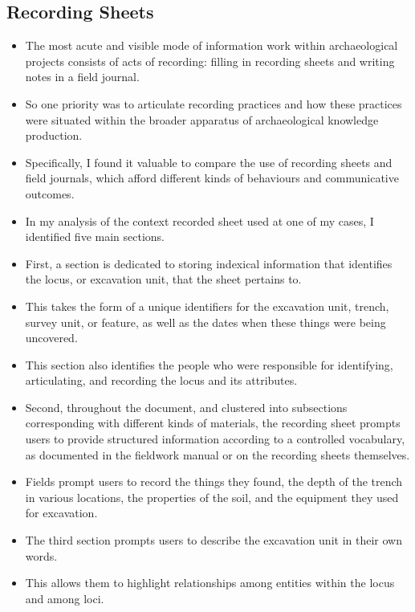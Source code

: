 \documentclass{article}
\begin{document}
\subsection{Recording Sheets}
\begin{itemize}
  \item The most acute and visible mode of information work within archaeological projects consists of acts of recording: filling in recording sheets and writing notes in a field journal.
  \item So one priority was to articulate recording practices and how these practices were situated within the broader apparatus of archaeological knowledge production.
  \item Specifically, I found it valuable to compare the use of recording sheets and field journals, which afford different kinds of behaviours and communicative outcomes.
  \item In my analysis of the context recorded sheet used at one of my cases, I identified five main sections.\\
  
  \item First, a section is dedicated to storing indexical information that identifies the locus, or excavation unit, that the sheet pertains to.
  \item This takes the form of a unique identifiers for the excavation unit, trench, survey unit, or feature, as well as the dates when these things were being uncovered.
  \item This section also identifies the people who were responsible for identifying, articulating, and recording the locus and its attributes.\\
  
  \item Second, throughout the document, and clustered into subsections corresponding with different kinds of materials, the recording sheet prompts users to provide structured information according to a controlled vocabulary, as documented in the fieldwork manual or on the recording sheets themselves.
  \item Fields prompt users to record the things they found, the depth of the trench in various locations, the properties of the soil, and the equipment they used for excavation.
  
  \item The third section prompts users to describe the excavation unit in their own words.
  \item This allows them to highlight relationships among entities within the locus and among loci.
  

\end{itemize}
\end{document}
